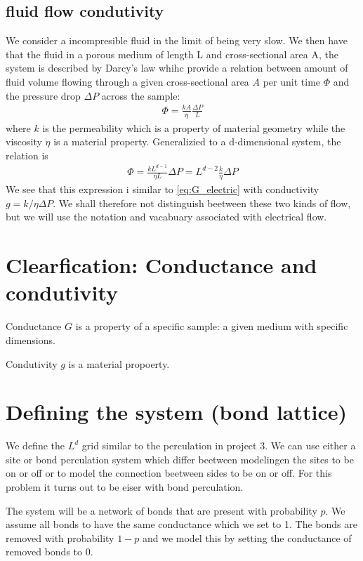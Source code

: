 \documentclass[reprint, amsmath, amssymb, aps]{revtex4-2}
\begin{document}
\subsection{fluid flow condutivity}
We consider a incompresible fluid in the limit of being very slow. We then have that the fluid in a porous medium of length L and cross-sectional area A, the system is described by Darcy's law whihc provide a relation between amount of fluid volume flowing through a given cross-sectional area $A$ per unit time $\Phi$ and the pressure drop $\Delta P$ across the sample:
\begin{align*}
  \Phi = \frac{kA}{\eta}\frac{\Delta P}{L}
\end{align*}
where $k$ is the permeability which is a property of material geometry while the viscosity $\eta$ is a material property. Generalizied to a d-dimensional system, the relation is
\begin{align}
  \Phi = \frac{k L^{d-1}}{\eta L}\Delta P = L^{d-2} \frac{k}{\eta}\Delta P
  \label{eq:G_fluid}
\end{align}
We see that this expression i similar to \ref{eq:G_electric} with conductivity $g = k/\eta \Delta P$. We shall therefore not distinguish beetween these two kinds of flow, but we will use the notation and vacabuary associated with electrical flow.


\section{Clearfication: Conductance and condutivity}
Conductance $G$ is a property of a specific sample: a given medium with specific dimensions. \par
Condutivity $g$ is a material propoerty.


\section{Defining the system (bond lattice)}
We define the $L^d$ grid similar to the perculation in project 3. We can use either a site or bond perculation system which differ beetween modelingen the sites to be on or off or to model the connection beetween sides to be on or off. For this problem it turns out to be eiser with bond perculation. \par
The system will be a network of bonds that are present with probability $p$. We assume all bonds to have the same conductance which we set to 1. The bonds are removed with probability $1-p$ and we model this by setting the conductance of removed bonds to 0.
\end{document}
